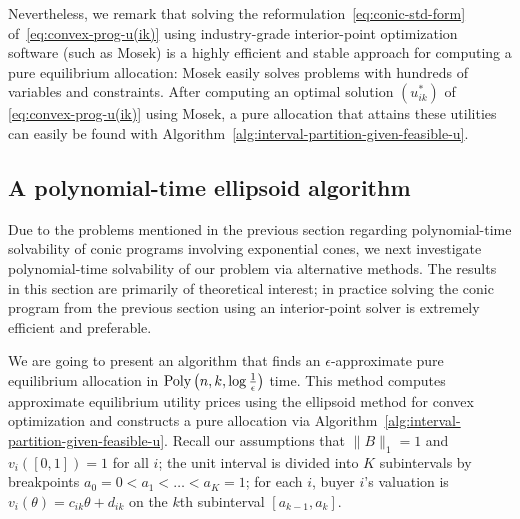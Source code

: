 Nevertheless, we remark that solving the reformulation~\eqref{eq:conic-std-form} of~\eqref{eq:convex-prog-u(ik)} using industry-grade interior-point optimization software (such as Mosek) is a highly efficient and stable approach for computing a pure equilibrium allocation: Mosek easily solves problems with hundreds of variables and constraints.
After computing an optimal solution $(u^*_{ik})$ of \eqref{eq:convex-prog-u(ik)} using Mosek, a pure allocation that attains these utilities can easily be found with Algorithm~\ref{alg:interval-partition-given-feasible-u}. %

\subsection{A polynomial-time ellipsoid algorithm} \label{subsec:compute-pure-eq-alloc-poly-time}
Due to the problems mentioned in the previous section regarding polynomial-time solvability of conic programs involving exponential cones, we next investigate polynomial-time solvability of our problem via alternative methods.
The results in this section are primarily of theoretical interest; in practice solving the conic program from the previous section using an interior-point solver is extremely efficient and preferable.

We are going to present an algorithm that finds an $\epsilon$-approximate pure equilibrium allocation in $\textnormal{Poly}\left(n,k,\log \frac{1}{\epsilon}\right)$ time.
This method computes approximate equilibrium utility prices using the ellipsoid method for convex optimization and constructs a pure allocation via Algorithm~\ref{alg:interval-partition-given-feasible-u}. Recall our assumptions that $\|B\|_1 = 1$ and $v_i([0,1]) = 1$ for all $i$; the unit interval is divided into $K$ subintervals by breakpoints $a_0 = 0 < a_1 < \dots < a_K = 1$; for each $i$, buyer $i$'s valuation is $v_i(\theta) = c_{ik}\theta+d_{ik}$ on the $k$th subinterval $[a_{k-1}, a_k]$. 
